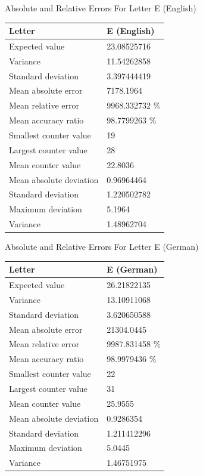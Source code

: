 \documentclass[]{revdetua}
\begin{document}
\begin{table}[!ht]
    \centering
    Absolute and Relative Errors For Letter E (English)
    \begin{tabular}{|l|l|}
    \hline
        Letter & E (English) \\ \hline
        Expected value & 23.08525716 \\ \hline
        Variance & 11.54262858 \\ \hline
        Standard deviation & 3.397444419 \\ \hline
        Mean absolute error & 7178.1964 \\ \hline
        Mean relative error & 9968.332732 \% \\ \hline
        Mean accuracy ratio & 98.7799263 \% \\ \hline
        Smallest counter value & 19 \\ \hline
        Largest counter value & 28 \\ \hline
        Mean counter value & 22.8036 \\ \hline
        Mean absolute deviation & 0.96964464 \\ \hline
        Standard deviation & 1.220502782 \\ \hline
        Maximum deviation & 5.1964 \\ \hline
        Variance & 1.48962704 \\ \hline
    \end{tabular}
\end{table}

\begin{table}[!ht]
    \centering
    Absolute and Relative Errors For Letter E (German)
    \begin{tabular}{|l|l|}
    \hline
        Letter & E (German) \\ \hline
        Expected value & 26.21822135 \\ \hline
        Variance & 13.10911068 \\ \hline
        Standard deviation & 3.620650588 \\ \hline
        Mean absolute error & 21304.0445 \\ \hline
        Mean relative error & 9987.831458 \% \\ \hline
        Mean accuracy ratio & 98.9979436 \% \\ \hline
        Smallest counter value & 22 \\ \hline
        Largest counter value & 31 \\ \hline
        Mean counter value & 25.9555 \\ \hline
        Mean absolute deviation & 0.9286354 \\ \hline
        Standard deviation & 1.211412296 \\ \hline
        Maximum deviation & 5.0445 \\ \hline
        Variance & 1.46751975 \\ \hline
    \end{tabular}
\end{table}
\end{document}
